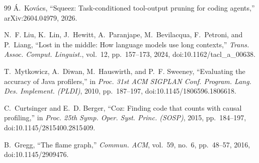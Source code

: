 \documentclass[conference]{IEEEtran}
\begin{document}
\begin{thebibliography}{99}
\'A.~Kov\'acs,
``Squeez: Task-conditioned tool-output pruning for coding agents,''
arXiv:2604.04979, 2026.

N.~F. Liu, K.~Lin, J.~Hewitt, A.~Paranjape, M.~Bevilacqua, F.~Petroni, and P.~Liang,
``Lost in the middle: How language models use long contexts,''
\emph{Trans. Assoc. Comput. Linguist.}, vol.~12, pp.~157--173, 2024,
doi:10.1162/tacl\_a\_00638.

T.~Mytkowicz, A.~Diwan, M.~Hauswirth, and P.~F. Sweeney,
``Evaluating the accuracy of {Java} profilers,''
in \emph{Proc. 31st ACM SIGPLAN Conf. Program. Lang. Des. Implement. (PLDI)}, 2010, pp.~187--197,
doi:10.1145/1806596.1806618.

C.~Curtsinger and E.~D. Berger,
``Coz: Finding code that counts with causal profiling,''
in \emph{Proc. 25th Symp. Oper. Syst. Princ. (SOSP)}, 2015, pp.~184--197,
doi:10.1145/2815400.2815409.

B.~Gregg,
``The flame graph,''
\emph{Commun. ACM}, vol.~59, no.~6, pp.~48--57, 2016,
doi:10.1145/2909476.

\end{thebibliography}
\end{document}
